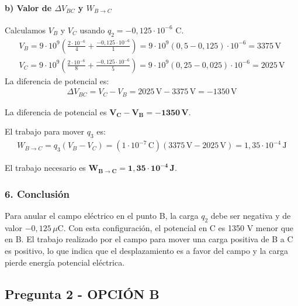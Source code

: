 \paragraph*{b) Valor de $\Delta V_{BC}$ y $W_{B \to C}$}
Calculamos $V_B$ y $V_C$ usando $q_2 = -0,125 \cdot 10^{-6}$ C.
\begin{gather}
    V_B = 9\cdot10^9 \left(\frac{2 \cdot 10^{-6}}{4} + \frac{-0,125 \cdot 10^{-6}}{1}\right) = 9\cdot10^9 (0,5 - 0,125) \cdot 10^{-6} = 3375 \, \text{V} \\
    V_C = 9\cdot10^9 \left(\frac{2 \cdot 10^{-6}}{8} + \frac{-0,125 \cdot 10^{-6}}{5}\right) = 9\cdot10^9 (0,25 - 0,025) \cdot 10^{-6} = 2025 \, \text{V}
\end{gather}
La diferencia de potencial es:
\begin{gather}
    \Delta V_{BC} = V_C - V_B = 2025 \, \text{V} - 3375 \, \text{V} = -1350 \, \text{V}
\end{gather}
\begin{cajaresultado}
    La diferencia de potencial es $\boldsymbol{V_C - V_B = -1350 \, \textbf{V}}$.
\end{cajaresultado}
El trabajo para mover $q_3$ es:
\begin{gather}
    W_{B \to C} = q_3 (V_B - V_C) = (1 \cdot 10^{-7} \, \text{C}) (3375 \, \text{V} - 2025 \, \text{V}) = 1,35 \cdot 10^{-4} \, \text{J}
\end{gather}
\begin{cajaresultado}
    El trabajo necesario es $\boldsymbol{W_{B \to C} = 1,35 \cdot 10^{-4} \, \textbf{J}}$.
\end{cajaresultado}

\subsubsection*{6. Conclusión}
\begin{cajaconclusion}
    Para anular el campo eléctrico en el punto B, la carga $q_2$ debe ser negativa y de valor $-0,125\,\mu\text{C}$. Con esta configuración, el potencial en C es 1350 V menor que en B. El trabajo realizado por el campo para mover una carga positiva de B a C es positivo, lo que indica que el desplazamiento es a favor del campo y la carga pierde energía potencial eléctrica.
\end{cajaconclusion}

\newpage

\subsection{Pregunta 2 - OPCIÓN B}
\label{subsec:2B_2025_jul_ext}


